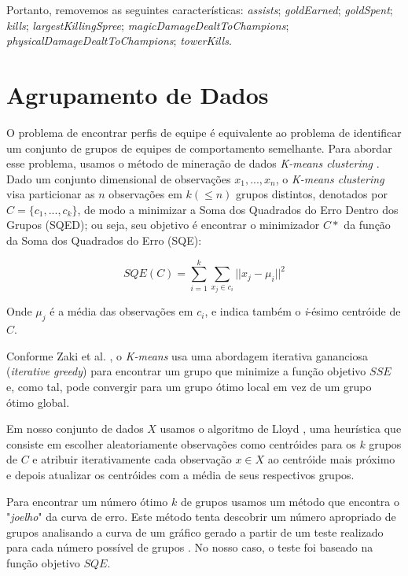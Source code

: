 Portanto, removemos as seguintes características: \textit{assists}; \textit{goldEarned}; \textit{goldSpent}; \textit{kills}; \textit{largestKillingSpree}; \textit{magicDamageDealtToChampions}; \textit{physicalDamageDealtToChampions}; \textit{towerKills}.

\chapter{Agrupamento de Dados}

O problema de encontrar perfis de equipe é equivalente ao problema de identificar um conjunto de grupos de equipes de comportamento semelhante. Para abordar esse problema, usamos o método de mineração de dados \textit{K-means clustering} \cite{zaki2014data}. Dado um conjunto dimensional de observações \(x_1, ..., x_n \), o \textit{K-means clustering} visa particionar as $n$ observações em $k (\leq n)$ grupos distintos, denotados por $ C = \{c_1, ... , c_k \} $, de modo a minimizar a Soma dos Quadrados do Erro Dentro dos Grupos (SQED); ou seja, seu objetivo é encontrar o minimizador $C*$ da função da Soma dos Quadrados do Erro (SQE):

\begin{displaymath}
  SQE(C) = \sum_{i=1}^{k} \sum_{x_j \in c_i}{} || x_j - \mu _i ||^2
\end{displaymath}

Onde $\mu_j$ é a média das observações em $c_i$, e indica também o \textit{i}-ésimo centróide de $C$.

Conforme Zaki et al. \cite{zaki2014data}, o \textit{K-means} usa uma abordagem iterativa gananciosa (\textit{iterative greedy}) para encontrar um grupo que minimize a função objetivo $SSE$ e, como tal, pode convergir para um grupo ótimo local em vez de um grupo ótimo global.

Em nosso conjunto de dados $X$ usamos o algoritmo de Lloyd \cite{ong2015player}, uma heurística que consiste em escolher aleatoriamente observações como centróides para os $k$ grupos de $C$ e atribuir iterativamente cada observação $x \in X$ ao centróide mais próximo e depois atualizar os centróides com a média de seus respectivos grupos.

Para encontrar um número ótimo $k$ de grupos usamos um método que encontra o "\textit{joelho}"  da curva de erro. Este método tenta descobrir um número apropriado de grupos analisando a curva de um gráfico gerado a partir de um teste realizado para cada número possível de grupos \cite{salvador2004determining}. No nosso caso, o teste foi baseado na função objetivo $SQE$.

